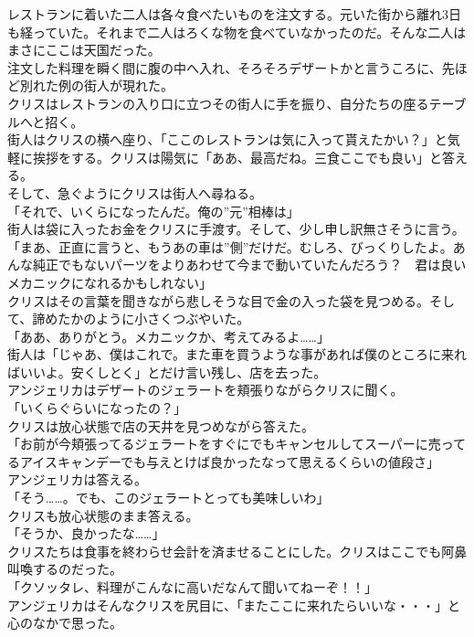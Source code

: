 \documentclass[b5j,10pt,openany]{jsbook}
\begin{document}
レストランに着いた二人は各々食べたいものを注文する。元いた街から離れ3日も経っていた。それまで二人はろくな物を食べていなかったのだ。そんな二人はまさにここは天国だった。\\注文した料理を瞬く間に腹の中へ入れ、そろそろデザートかと言うころに、先ほど別れた例の街人が現れた。\\クリスはレストランの入り口に立つその街人に手を振り、自分たちの座るテーブルへと招く。\\街人はクリスの横へ座り、「ここのレストランは気に入って貰えたかい？」と気軽に挨拶をする。クリスは陽気に「ああ、最高だね。三食ここでも良い」と答える。\\そして、急ぐようにクリスは街人へ尋ねる。\\「それで、いくらになったんだ。俺の''元''相棒は」\\街人は袋に入ったお金をクリスに手渡す。そして、少し申し訳無さそうに言う。\\「まあ、正直に言うと、もうあの車は''側''だけだ。むしろ、びっくりしたよ。あんな純正でもないパーツをよりあわせて今まで動いていたんだろう？　君は良いメカニックになれるかもしれない」\\クリスはその言葉を聞きながら悲しそうな目で金の入った袋を見つめる。そして、諦めたかのように小さくつぶやいた。\\「ああ、ありがとう。メカニックか、考えてみるよ\ldots{}\ldots{}」\\街人は「じゃあ、僕はこれで。また車を買うような事があれば僕のところに来ればいいよ。安くしとく」とだけ言い残し、店を去った。\\アンジェリカはデザートのジェラートを頬張りながらクリスに聞く。\\「いくらぐらいになったの？」\\クリスは放心状態で店の天井を見つめながら答えた。\\「お前が今頬張ってるジェラートをすぐにでもキャンセルしてスーパーに売ってるアイスキャンデーでも与えとけば良かったなって思えるくらいの値段さ」\\アンジェリカは答える。\\「そう\ldots{}\ldots{}。でも、このジェラートとっても美味しいわ」\\クリスも放心状態のまま答える。\\「そうか、良かったな\ldots{}\ldots{}」\\クリスたちは食事を終わらせ会計を済ませることにした。クリスはここでも阿鼻叫喚するのだった。\\「クソッタレ、料理がこんなに高いだなんて聞いてねーぞ！！」\\アンジェリカはそんなクリスを尻目に、「またここに来れたらいいな・・・」と心のなかで思った。
\end{document}
